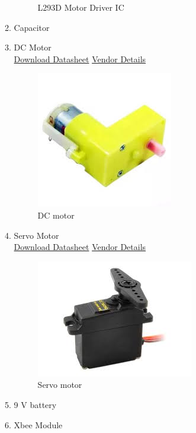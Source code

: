 \documentclass[a4paper,12pt,oneside]{book}
\begin{document}
\begin{itemize}
\begin{enumerate}
\begin{figure}[H]
        \caption{L293D Motor Driver IC}
      \end{figure}
      \item Capacitor
      \item DC Motor  \\
      \href{www.skillrextechnology.com/wp-content/uploads/2015/09/BO-motor-L-shape-60-rpm.pdf} {Download Datasheet}
      \href{http://www.amazon.in/DC-Hobby-BO-Motor-100/dp/B00U3SQ4QI?tag=googinhydr18418-21&tag=googinkenshoo-21&ascsubtag=eb9a03a0-9790-4e4b-a18b-993e01fdd975} {Vendor Details}
      \begin{figure}[H]
        \centering
        \includegraphics[scale=0.6]{dc}
        \caption{DC motor}
      \end{figure}
      \item Servo Motor \\
      \href{www.goteckrc.com/Download/STD\%20Servo/GS-5515MG.pdf} {Download Datasheet}
      \href{http://www.amazon.in/Robodo-Electronics-TowerPro-MG995-Servo/dp/B00MTH0RMI?tag=googinhydr18418-21&tag=googinkenshoo-21&ascsubtag=eb9a03a0-9790-4e4b-a18b-993e01fdd975} {Vendor Details}
      \begin{figure}[H]
        \centering
        \includegraphics[scale=0.6]{servo}
        \caption{Servo motor}
      \end{figure}
      \item 9 V battery
      \item Xbee Module  \\

\end{enumerate}
\end{itemize}
\end{document}
